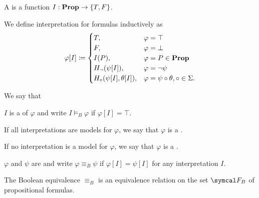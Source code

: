\begin{definition}\label{def:propositional_interpretation}
  A  is a function $I: \operatorname{\mathbf{Prop}} \to \{ T, F \}$.

  We define interpretation for formulas inductively as
  \begin{align*}
    \varphi[I] \coloneqq \begin{cases}
      T,                           &\varphi = \top \\
      F,                           &\varphi = \bot \\
      I(P),                        &\varphi = P \in \operatorname{\mathbf{Prop}} \\
      H_\neg(\psi[I]),             &\varphi = \neg \psi         \\
      H_\circ(\psi[I], \theta[I]), &\varphi = \psi \circ \theta, \circ \in \Sigma.
    \end{cases}
  \end{align*}

  We say that
  \begin{defenum}
    \item\label{def:propositional_interpretation/model} $I$ is a  of $\varphi$ and write $I \models_B \varphi$ if $\varphi[I] = \top$.
    \item\label{def:propositional_interpretation/tautology} If all interpretations are models for $\varphi$, we say that $\varphi$ is a .
    \item\label{def:propositional_interpretation/contradiction} If no interpretation is a model for $\varphi$, we say that $\varphi$ is a .
    \item\label{def:propositional_interpretation/equivalence} $\varphi$ and $\psi$ are  and write $\varphi \equiv_B \psi$ if $\varphi[I] = \psi[I]$ for any interpretation $I$.
  \end{defenum}
\end{definition}

\begin{proposition}\label{thm:boolean_equivalence_relation}
  The Boolean equivalence $\equiv_B$ is an equivalence relation on the set $\Cal{F}_B$ of propositional formulas.
\end{proposition}

